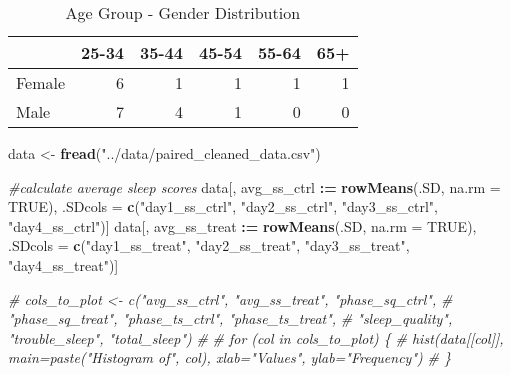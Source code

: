 \documentclass[
]{article}
\newenvironment{Shaded}{\begin{snugshade}}{\end{snugshade}}
\newcommand{\AttributeTok}[1]{\textcolor[rgb]{0.13,0.29,0.53}{#1}}
\newcommand{\CommentTok}[1]{\textcolor[rgb]{0.56,0.35,0.01}{\textit{#1}}}
\newcommand{\ConstantTok}[1]{\textcolor[rgb]{0.56,0.35,0.01}{#1}}
\newcommand{\FunctionTok}[1]{\textcolor[rgb]{0.13,0.29,0.53}{\textbf{#1}}}
\newcommand{\NormalTok}[1]{#1}
\newcommand{\OtherTok}[1]{\textcolor[rgb]{0.56,0.35,0.01}{#1}}
\newcommand{\SpecialCharTok}[1]{\textcolor[rgb]{0.81,0.36,0.00}{\textbf{#1}}}
\newcommand{\StringTok}[1]{\textcolor[rgb]{0.31,0.60,0.02}{#1}}
\begin{document}
\begin{table}

\caption{\label{tab:unnamed-chunk-3}Age Group - Gender Distribution}
\centering
\begin{tabular}[t]{lrrrrr}
\toprule
  & 25-34 & 35-44 & 45-54 & 55-64 & 65+\\
\midrule
Female & 6 & 1 & 1 & 1 & 1\\
Male & 7 & 4 & 1 & 0 & 0\\
\bottomrule
\end{tabular}
\end{table}

\begin{Shaded}
\begin{Highlighting}[]
\NormalTok{data }\OtherTok{\textless{}{-}} \FunctionTok{fread}\NormalTok{(}\StringTok{"../data/paired\_cleaned\_data.csv"}\NormalTok{)}

\CommentTok{\#calculate average sleep scores}
\NormalTok{data[, avg\_ss\_ctrl }\SpecialCharTok{:=} \FunctionTok{rowMeans}\NormalTok{(.SD, }\AttributeTok{na.rm =} \ConstantTok{TRUE}\NormalTok{), .SDcols }\OtherTok{=} \FunctionTok{c}\NormalTok{(}\StringTok{"day1\_ss\_ctrl"}\NormalTok{, }\StringTok{"day2\_ss\_ctrl"}\NormalTok{, }\StringTok{"day3\_ss\_ctrl"}\NormalTok{, }\StringTok{"day4\_ss\_ctrl"}\NormalTok{)]}
\NormalTok{data[, avg\_ss\_treat }\SpecialCharTok{:=} \FunctionTok{rowMeans}\NormalTok{(.SD, }\AttributeTok{na.rm =} \ConstantTok{TRUE}\NormalTok{), .SDcols }\OtherTok{=} \FunctionTok{c}\NormalTok{(}\StringTok{"day1\_ss\_treat"}\NormalTok{, }\StringTok{"day2\_ss\_treat"}\NormalTok{, }\StringTok{"day3\_ss\_treat"}\NormalTok{, }\StringTok{"day4\_ss\_treat"}\NormalTok{)]}
\end{Highlighting}
\end{Shaded}

\begin{Shaded}
\begin{Highlighting}[]
\CommentTok{\# cols\_to\_plot \textless{}{-} c("avg\_ss\_ctrl", "avg\_ss\_treat", "phase\_sq\_ctrl", }
\CommentTok{\#                   "phase\_sq\_treat", "phase\_ts\_ctrl", "phase\_ts\_treat", }
\CommentTok{\#                   "sleep\_quality", "trouble\_sleep", "total\_sleep")}
\CommentTok{\# }
\CommentTok{\# for (col in cols\_to\_plot) \{}
\CommentTok{\#   hist(data[[col]], main=paste("Histogram of", col), xlab="Values", ylab="Frequency")}
\CommentTok{\# \}}
\end{Highlighting}
\end{Shaded}
\end{document}
